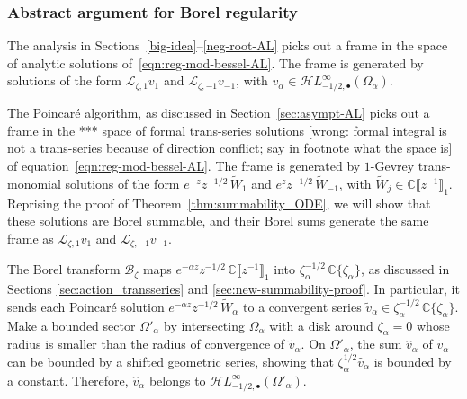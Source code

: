 \documentclass{article}
\newcommand{\singexp}[2]{\mathcal{H}L^\infty_{#1, #2}}
\newcommand{\singexpalg}[1]{\singexp{#1}{\bullet}}
\newcommand{\C}{\mathbb{C}}
\newcommand{\series}[1]{\tilde{#1}}
\newcommand{\laplace}{\mathcal{L}}
\newcommand{\borel}{\mathcal{B}}
\theoremstyle{definition}
\theoremstyle{plain}
\newenvironment{todo}{\color{Coral}}{\color{black}}
\newenvironment{draft}{\color{SlateBlue}}{\color{black}}
\begin{document}
\subsubsection{Abstract argument for Borel regularity}\label{bessel-regularity-AL}
The analysis in Sections~\ref{big-idea}\;--\;\ref{neg-root-AL} picks out a frame in the space of analytic solutions of~\eqref{eqn:reg-mod-bessel-AL}. The frame is generated by solutions of the form $\laplace_{\zeta, 1} v_1$ and $\laplace_{\zeta, -1} v_{-1}$, with $v_\alpha \in \singexpalg{-1/2}(\Omega_\alpha)$.

The Poincar\'{e} algorithm, as discussed in Section~\ref{sec:asympt-AL} picks out a frame in the \begin{draft}***\end{draft} \begin{todo}space of formal trans-series solutions [wrong: formal integral is not a trans-series because of direction conflict; say in footnote what the space is]\end{todo} of equation~\eqref{eqn:reg-mod-bessel-AL}. The frame is generated by $1$-Gevrey trans-monomial solutions of the form $e^{-z} z^{-1/2}\,\tilde{W}_1$ and $e^z z^{-1/2}\,\tilde{W}_{-1}$, with $\tilde{W}_j \in \C\llbracket z^{-1} \rrbracket_1$. Reprising the proof of Theorem~\ref{thm:summability_ODE}, we will show that these solutions are Borel summable, and their Borel sums generate the same frame as $\laplace_{\zeta, 1} v_1$ and $\laplace_{\zeta, -1} v_{-1}$.

The Borel transform $\borel_\zeta$ maps $e^{-\alpha z} z^{-1/2}\,\C\llbracket z^{-1} \rrbracket_1$ into $\zeta_\alpha^{-1/2}\,\C\{\zeta_\alpha\}$, as discussed in Sections \ref{sec:action_transseries} and \ref{sec:new-summability-proof}. In particular, it sends each Poincar\'{e} solution $e^{-\alpha z} z^{-1/2}\,\series{W}_\alpha$ to a convergent series $\series{v}_\alpha \in \zeta_\alpha^{-1/2}\,\C\{\zeta_\alpha\}$. Make a bounded sector $\Omega'_\alpha$ by intersecting $\Omega_\alpha$ with a disk around $\zeta_\alpha = 0$ whose radius is smaller than the radius of convergence of $\series{v}_\alpha$. On $\Omega'_\alpha$, the sum $\hat{v}_\alpha$ of $\series{v}_\alpha$ can be bounded by a shifted geometric series, showing that $\zeta_\alpha^{1/2} \hat{v}_\alpha$ is bounded by a constant. Therefore, $\hat{v}_\alpha$ belongs to $\singexpalg{-1/2}(\Omega'_\alpha)$.
\end{document}
